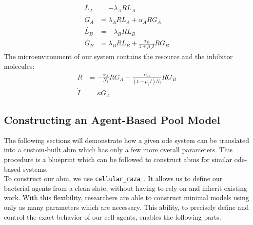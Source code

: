 \documentclass[10pt,twocolumn,5p]{elsarticle}
\numberwithin{equation}{section}
\begin{document}
%
\begin{align}
    \dot{L_A} &= -\lambda_A R L_A\\
    \dot{G_A} &= \lambda_A R L_A + \alpha_A R G_A\\
    \dot{L_B} &= -\lambda_B R L_B\\
    \dot{G_B} &= \lambda_B R L_B + \frac{\alpha_B}{1 + \mu_I I} R G_B
    \label{eq:spatial_limit_F}
\end{align}
%
The microenvironment of our system contains the resource and the inhibitor molecules:
\begin{align}
    \dot{R} &= -\frac{\alpha_A}{N_t} R G_A-\frac{\alpha_B}{(1 + \mu_I I) N_t} R G_B \\
    \dot{I} &= \kappa G_A
    \label{eq:spatial_limit_H}
\end{align}

\subsection{Constructing an Agent-Based Pool Model}
The following sections will demonstrate how a given \ac{ode} system can be translated into a
custom-built \ac{abm} which has only a few more overall parameters.
This procedure is a blueprint which can be followed to construct \acp{abm} for similar
\ac{ode}-based systems.\\
To construct our \ac{abm}, we use \texttt{cellular\_raza}~\cite{Pleyer2025}.
It allows us to define our bacterial agents from a clean slate, without having to rely on and inherit
existing work.
With this flexibility, researchers are able to construct minimal models using only as many parameters which are necessary.
This ability, to precisely define and control the exact behavior of our cell-agents, enables the following parts.
\end{document}
